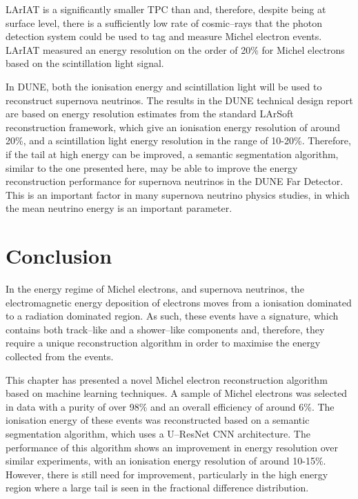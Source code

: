 LArIAT is a significantly smaller TPC than \protodune{} and, therefore, despite
being at surface level, there is a sufficiently low rate of cosmic--rays that the
photon detection system could be used to tag and measure Michel electron events.
LArIAT measured an energy resolution on the order of 20\% for Michel electrons
based on the scintillation light signal\cite{Foreman_2016}.

In DUNE, both the ionisation energy and scintillation light will be used to
reconstruct supernova neutrinos. The results in the DUNE technical design
report are based on energy resolution estimates from the standard
LArSoft reconstruction framework, which give an ionisation energy resolution of
around 20\%, and a scintillation light energy resolution in the range of
10-20\%\cite{Abi:2020evt}. Therefore, if the tail at high energy can be
improved, a semantic segmentation algorithm, similar to the one presented
here, may be able to improve the energy reconstruction performance for
supernova neutrinos in the DUNE Far Detector. This is an important factor in
many supernova neutrino physics studies, in which the mean neutrino energy is an
important parameter\cite{Abi:2020evt}.

\section{Conclusion} \label{ME_EU}

In the energy regime of Michel electrons, and supernova neutrinos, the
electromagnetic energy deposition of electrons moves from a ionisation dominated
to a radiation dominated region. As such, these events have a signature, which
contains both track--like and a shower--like components and, therefore, they
require a unique reconstruction algorithm in order to maximise the energy
collected from the events.

This chapter has presented a novel Michel electron reconstruction algorithm 
based on machine learning techniques. A sample of Michel electrons was 
selected in \protodune{} data with a purity of over 98\% and an overall 
efficiency of around 6\%. The ionisation energy of these events was 
reconstructed based on a semantic segmentation algorithm, which uses a 
U--ResNet CNN architecture. The performance of this algorithm shows an 
improvement in energy resolution over similar experiments, with an ionisation 
energy resolution of around 10-15\%. However, there is still need for 
improvement, particularly in the high energy region where a large tail is seen 
in the fractional difference distribution.

